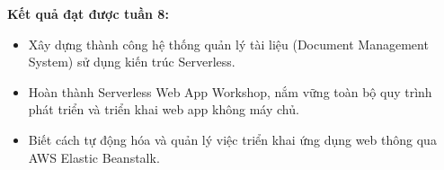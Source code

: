 \vspace{0.5em}\noindent\textbf{Kết quả đạt được tuần
8:}\par

\begin{itemize}
\tightlist
\item
  Xây dựng thành công hệ thống quản lý tài liệu (Document Management
  System) sử dụng kiến trúc Serverless.
\item
  Hoàn thành Serverless Web App Workshop, nắm vững toàn bộ quy trình
  phát triển và triển khai web app không máy chủ.
\item
  Biết cách tự động hóa và quản lý việc triển khai ứng dụng web thông
  qua AWS Elastic Beanstalk.
\end{itemize}
